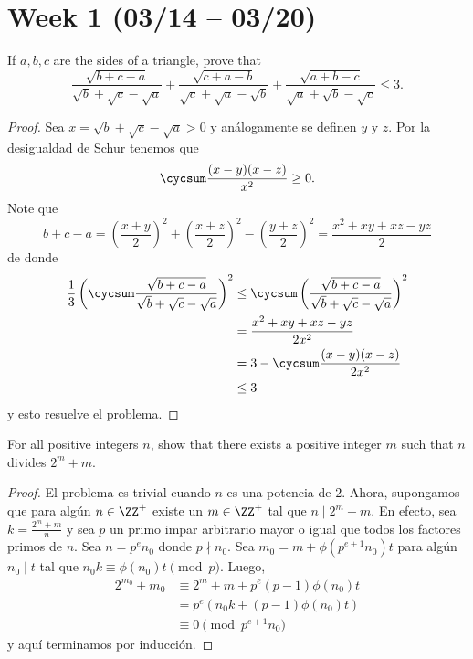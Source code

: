 \section{Week 1 (03/14 -- 03/20)}

\begin{probEG}
	If $a,b,c$ are the sides of a triangle, prove that
	\[\frac{\sqrt{b+c-a}}{\sqrt b+\sqrt c-\sqrt a}+\frac{\sqrt{c+a-b}}{\sqrt c+\sqrt a-\sqrt b}+\frac{\sqrt{a+b-c}}{\sqrt a+\sqrt b-\sqrt c}\le 3.\]
\end{probEG}

\begin{proof}
	Sea $x=\sqrt b+\sqrt c-\sqrt a>0$ y análogamente se definen $y$ y $z$. Por la desigualdad de Schur tenemos que
	\[\cycsum\frac{(x-y)(x-z)}{x^2}\ge 0.\]
	Note que
	\[b+c-a=\left(\frac{x+y}{2}\right)^2+\left(\frac{x+z}{2}\right)^2-\left(\frac{y+z}{2}\right)^2=\frac{x^2+xy+xz-yz}{2}\]
	de donde
	\begin{align*}
		\frac13\left(\cycsum\frac{\sqrt{b+c-a}}{\sqrt b+\sqrt c-\sqrt a}\right)^2
		&\le\cycsum\left(\frac{\sqrt{b+c-a}}{\sqrt b+\sqrt c-\sqrt a}\right)^2\\
		&=\frac{x^2+xy+xz-yz}{2x^2}\\
		&=3-\cycsum\frac{(x-y)(x-z)}{2x^2}\\
		&\le 3
	\end{align*}
	y esto resuelve el problema.
\end{proof}

\begin{probEB}
	For all positive integers $n$, show that there exists a positive integer $m$ such that $n$ divides $2^m+m$.
\end{probEB}

\begin{proof}
	El problema es trivial cuando $n$ es una potencia de $2$. Ahora, supongamos que para algún $n\in\ZZ^+$ existe un $m\in\ZZ^+$ tal que $n\mid 2^m+m$. En efecto, sea $k=\frac{2^m+m}{n}$ y sea $p$ un primo impar arbitrario mayor o igual que todos los factores primos de $n$. Sea $n=p^en_0$ donde $p\nmid n_0$. Sea $m_0=m+\phi(p^{e+1}n_0)t$ para algún $n_0\mid t$ tal que $n_0k\equiv\phi(n_0)t\pmod p$. Luego,
	\begin{align*}
		2^{m_0}+m_0
		&\equiv 2^m+m+p^e(p-1)\phi(n_0)t\\
		&=p^e\left(n_0k+(p-1)\phi(n_0)t\right)\\
		&\equiv 0\pmod{p^{e+1}n_0}
	\end{align*}
	y aquí terminamos por inducción.
\end{proof}

